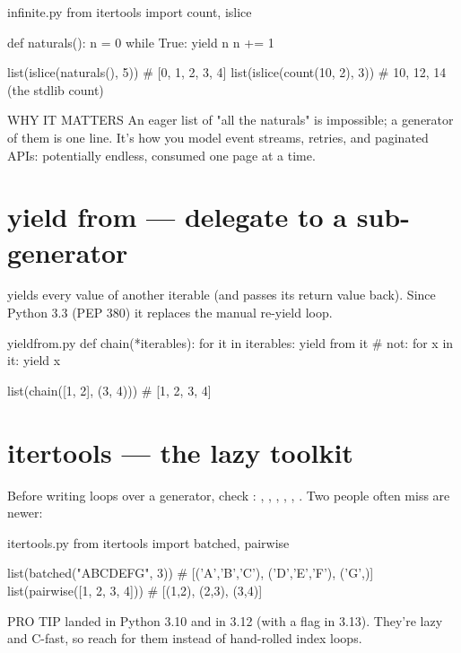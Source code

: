 \begin{pycard}{infinite.py}
from itertools import count, islice

def naturals():
    n = 0
    while True:
        yield n
        n += 1

list(islice(naturals(), 5))   # [0, 1, 2, 3, 4]
list(islice(count(10, 2), 3)) # 10, 12, 14  (the stdlib count)
\end{pycard}

\begin{callout}{WHY IT MATTERS}
An eager list of "all the naturals" is impossible; a generator of them is one line. It's how you model event streams, retries, and paginated APIs: potentially endless, consumed one page at a time.
\end{callout}

\section{yield from — delegate to a sub-generator}

 yields every value of another iterable (and passes its return value back). Since Python 3.3 (PEP 380) it replaces the manual re-yield loop.

\begin{pycard}{yieldfrom.py}
def chain(*iterables):
    for it in iterables:
        yield from it          # not: for x in it: yield x

list(chain([1, 2], (3, 4)))    # [1, 2, 3, 4]
\end{pycard}

\section{itertools — the lazy toolkit}

Before writing loops over a generator, check : , , , , , . Two people often miss are newer:

\begin{pycard}{itertools.py}
from itertools import batched, pairwise

list(batched("ABCDEFG", 3))   # [('A','B','C'), ('D','E','F'), ('G',)]
list(pairwise([1, 2, 3, 4]))  # [(1,2), (2,3), (3,4)]
\end{pycard}

\begin{callout}[dotgreen]{PRO TIP}
 landed in Python 3.10 and  in 3.12 (with a  flag in 3.13). They're lazy and C-fast, so reach for them instead of hand-rolled index loops.
\end{callout}

